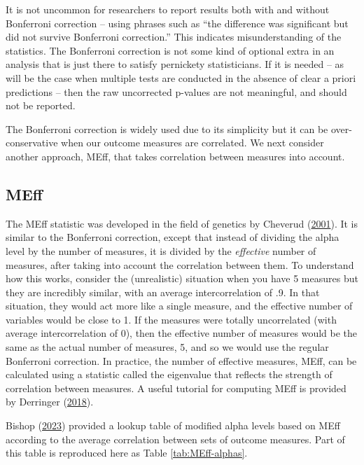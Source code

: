 \documentclass{krantz}
\begin{document}
It is not uncommon for researchers to report results both with and without Bonferroni correction -- using phrases such as ``the difference was significant but did not survive Bonferroni correction.'' This indicates misunderstanding of the statistics. The Bonferroni correction is not some kind of optional extra in an analysis that is just there to satisfy pernickety statisticians. If it is needed -- as will be the case when multiple tests are conducted in the absence of clear a priori predictions -- then the raw uncorrected p-values are not meaningful, and should not be reported.

The Bonferroni correction is widely used due to its simplicity but it can be over-conservative when our outcome measures are correlated. We next consider another approach, MEff, that takes correlation between measures into account.

\hypertarget{meff}{%
\subsection{MEff}\label{meff}}

The MEff statistic was developed in the field of genetics by Cheverud (\protect\hyperlink{ref-cheverud2001}{2001}). It is similar to the Bonferroni correction, except that instead of dividing the alpha level by the number of measures, it is divided by the \emph{effective} number of measures, after taking into account the correlation between them. To understand how this works, consider the (unrealistic) situation when you have 5 measures but they are incredibly similar, with an average intercorrelation of .9. In that situation, they would act more like a single measure, and the effective number of variables would be close to 1. If the measures were totally uncorrelated (with average intercorrelation of 0), then the effective number of measures would be the same as the actual number of measures, 5, and so we would use the regular Bonferroni correction. In practice, the number of effective measures, MEff, can be calculated using a statistic called the eigenvalue that reflects the strength of correlation between measures. A useful tutorial for computing MEff is provided by Derringer (\protect\hyperlink{ref-derringer2018a}{2018}).

Bishop (\protect\hyperlink{ref-bishop2023b}{2023}) provided a lookup table of modified alpha levels based on MEff according to the average correlation between sets of outcome measures. Part of this table is reproduced here as Table \ref{tab:MEff-alphas}.
\end{document}
